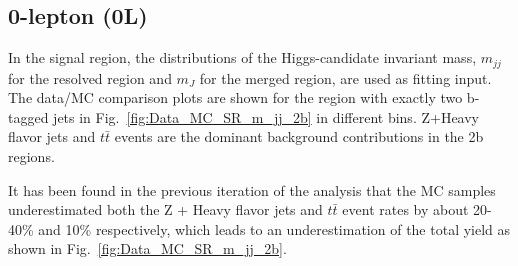 \subsection{0-lepton (0L)}

\par In the signal region, the distributions of the Higgs-candidate invariant mass, $m_{jj}$ for the
 resolved region and $m_J$ for the merged region, are used as fitting input. The data/MC comparison plots are shown for the region
 with exactly two b-tagged jets in Fig.~\ref{fig:Data_MC_SR_m_jj_2b} in different \met bins. Z+Heavy flavor jets and $t\bar{t}$ events are the dominant background contributions in the 2b regions.
\par It has been found in the previous iteration of the analysis that the MC samples underestimated both the Z + Heavy flavor jets and
$t\bar{t}$ event rates by about 20-40\% and 10\% respectively, which leads to an underestimation of the total yield as shown in Fig.~\ref{fig:Data_MC_SR_m_jj_2b}.


